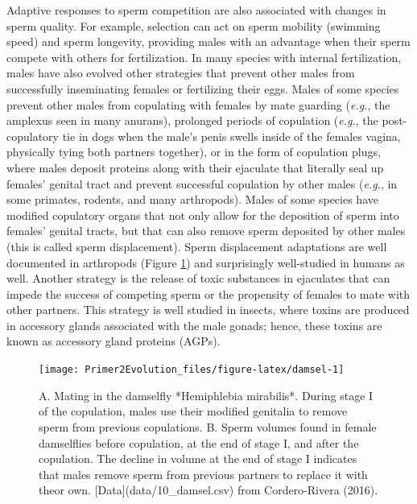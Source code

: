 \documentclass[
]{book}
\begin{document}
Adaptive responses to sperm competition are also associated with changes in sperm quality. For example, selection can act on sperm mobility (swimming speed) and sperm longevity, providing males with an advantage when their sperm compete with others for fertilization. In many species with internal fertilization, males have also evolved other strategies that prevent other males from successfully inseminating females or fertilizing their eggs. Males of some species prevent other males from copulating with females by mate guarding (\emph{e.g.}, the amplexus seen in many anurans), prolonged periods of copulation (\emph{e.g.}, the post-copulatory tie in dogs when the male's penis swells inside of the females vagina, physically tying both partners together), or in the form of copulation plugs, where males deposit proteins along with their ejaculate that literally seal up females' genital tract and prevent successful copulation by other males (\emph{e.g.}, in some primates, rodents, and many arthropods). Males of some species have modified copulatory organs that not only allow for the deposition of sperm into females' genital tracts, but that can also remove sperm deposited by other males (this is called sperm displacement). Sperm displacement adaptations are well documented in arthropods (Figure \ref{fig:damsel}) and surprisingly well-studied in humans as well. Another strategy is the release of toxic substances in ejaculates that can impede the success of competing sperm or the propensity of females to mate with other partners. This strategy is well studied in insects, where toxins are produced in accessory glands associated with the male gonads; hence, these toxins are known as accessory gland proteins (AGPs).

\begin{figure}
\texttt{[image: Primer2Evolution\_files/figure-latex/damsel-1]} \caption{A. Mating in the damselfly *Hemiphlebia mirabilis*. During stage I of the copulation, males use their modified genitalia to remove sperm from previous copulations. B. Sperm volumes found in female damselflies before copulation, at the end of stage I, and after the copulation. The decline in volume at the end of stage I indicates that males remove sperm from previous partners to replace it with theor own. [Data](data/10_damsel.csv) from Cordero-Rivera (2016).}\label{fig:damsel}
\end{figure}
\end{document}
